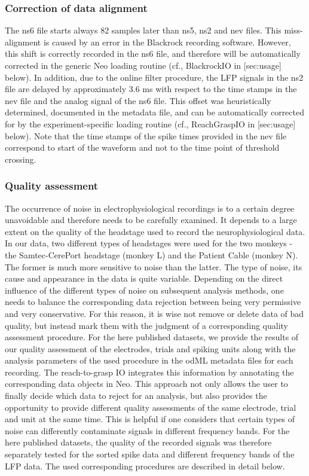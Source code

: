 {\subsubsection{Correction of data alignment}

The ns6 file starts always 82 samples later than ns5, ns2 and nev files. This miss-alignment is caused by an error in the Blackrock recording software. However, this shift is correctly recorded in the ns6 file, and therefore will be automatically corrected in the generic Neo loading routine (cf., BlackrockIO in [sec:usage] below). In addition, due to the online filter procedure, the LFP signals in the ns2 file are delayed by approximately 3.6 ms with respect to the time stamps in the nev file and the analog signal of the ns6 file. This offset was heuristically determined, documented in the metadata file, and can be automatically corrected for by the experiment-specific loading routine (cf., ReachGraspIO in [sec:usage] below). Note that the time stamps of the spike times provided in the nev file correspond to start of the waveform and not to the time point of threshold crossing.

\subsubsection{Quality assessment}

The occurrence of noise in electrophysiological recordings is to a certain degree unavoidable and therefore needs to be carefully examined. It depends to a large extent on the quality of the headstage used to record the neurophysiological data. In our data, two different types of headstages were used for the two monkeys - the Samtec-CerePort headstage (monkey L) and the Patient Cable (monkey N). The former is much more sensitive to noise than the latter. The type of noise, its cause and appearance in the data is quite variable. Depending on the direct influence of the different types of noise on subsequent analysis methods, one needs to balance the corresponding data rejection between being very permissive and very conservative. For this reason, it is wise not remove or delete data of bad quality, but instead mark them with the judgment of a corresponding quality assessment procedure. For the here published datasets, we provide the results of our quality assessment of the electrodes, trials and spiking units along with the analysis parameters of the used procedure in the odML metadata files for each recording. The reach-to-grasp IO integrates this information by annotating the corresponding data objects in Neo. This approach not only allows the user to finally decide which data to reject for an analysis, but also provides the opportunity to provide different quality assessments of the same electrode, trial and unit at the same time. This is helpful if one considers that certain types of noise can differently contaminate signals in different frequency bands. For the here published datasets, the quality of the recorded signals was therefore separately tested for the sorted spike data and different frequency bands of the LFP data. The used corresponding procedures are described in detail below. 

}
